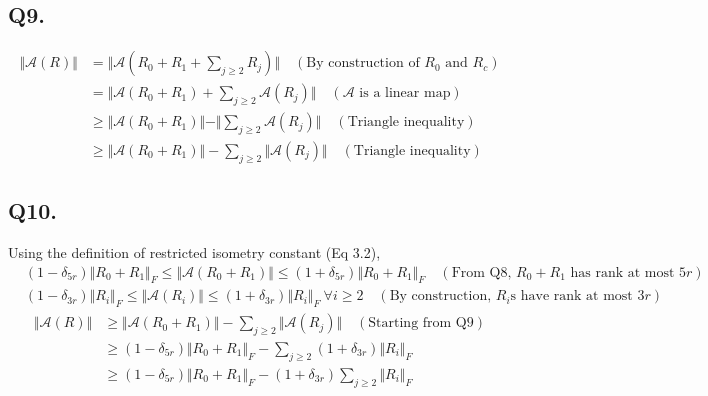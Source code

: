 \documentclass[fleqn, 11pt]{article}
\begin{document}
\subsection*{Q9.}
\begin{equation*}
    \begin{aligned}
        \Vert \mathcal{A}(R) \Vert &= \Vert \mathcal{A}(R_0 + R_1 + \sum_{j \ge 2} R_j) \Vert \quad (\text{By construction of $R_0$ and $R_c$}) \\
            &= \Vert \mathcal{A}\left(R_0 + R_1\right) + \sum_{j \ge 2} \mathcal{A}(R_j) \Vert \quad (\text{$\mathcal{A}$ is a linear map}) \\
            &\ge \Vert \mathcal{A}\left(R_0 + R_1\right) \Vert - \Vert \sum_{j \ge 2} \mathcal{A}(R_j) \Vert \quad (\text{Triangle inequality}) \\
            &\ge \Vert \mathcal{A}\left(R_0 + R_1\right) \Vert - \sum_{j \ge 2} \Vert \mathcal{A}(R_j) \Vert \quad (\text{Triangle inequality})
    \end{aligned}
\end{equation*}

\subsection*{Q10.}
Using the definition of restricted isometry constant (Eq 3.2),
\begin{equation*}
    \begin{aligned}
        & (1 - \delta_{5r}) \Vert R_0 + R_1 \Vert_F \le \Vert \mathcal{A}(R_0 + R_1) \Vert \le (1 + \delta_{5r}) \Vert R_0 + R_1 \Vert_F \quad (\text{From Q8, $R_0 + R_1$ has rank at most $5r$}) \\
        & (1 - \delta_{3r}) \Vert R_i \Vert_F \le \Vert \mathcal{A}(R_i) \Vert \le (1 + \delta_{3r}) \Vert R_i \Vert_F  \ \forall i \ge 2 \quad (\text{By construction, $R_i$s have rank at most $3r$})
    \end{aligned}
\end{equation*}
\begin{equation*}
    \begin{aligned}
        \Vert \mathcal{A}(R) \Vert &\ge\Vert \mathcal{A}\left(R_0 + R_1\right) \Vert - \sum_{j \ge 2} \Vert \mathcal{A}(R_j) \Vert \quad (\text{Starting from Q9}) \\
            &\ge (1 - \delta_{5r}) \Vert R_0 + R_1 \Vert_F - \sum_{j \ge 2} (1 + \delta_{3r}) \Vert R_i \Vert_F \\
            &\ge (1 - \delta_{5r}) \Vert R_0 + R_1 \Vert_F - (1 + \delta_{3r}) \sum_{j \ge 2} \Vert R_i \Vert_F \\
    \end{aligned}
\end{equation*}
\end{document}
